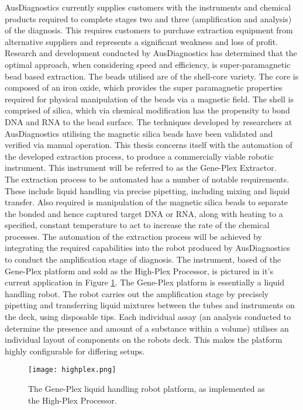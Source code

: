 AusDiagnostics currently supplies customers with the instruments and chemical products required to complete stages two and three (amplification and analysis) of the diagnosis. This requires customers to purchase extraction equipment from alternative suppliers and represents a significant weakness and loss of profit. Research and development conducted by AusDiagnostics has determined that the optimal approach, when considering speed and efficiency, is super-paramagnetic bead based extraction. The beads utilised are of the shell-core variety. The core is composed of an iron oxide, which provides the super paramagnetic properties required for physical manipulation of the beads via a magnetic field. The shell is comprised of silica, which via chemical modification has the propensity to bond DNA and RNA to the bead surface. The techniques developed by researchers at AusDiagnostics utilising the magnetic silica beads have been validated and verified via manual operation. This thesis concerns itself with the automation of the developed extraction process, to produce a commercially viable robotic instrument. This instrument will be referred to as the Gene-Plex Extractor.\\

The extraction process to be automated has a number of notable requirements. These include liquid handling via precise pipetting, including mixing and liquid transfer. Also required is manipulation of the magnetic silica beads to separate the bonded and hence captured target DNA or RNA, along with heating to a specified, constant temperature to act to increase the rate of the chemical processes. The automation of the extraction process will be achieved by integrating the required capabilities into the robot produced by AusDiagnostics to conduct the amplification stage of diagnosis. The instrument, based of the Gene-Plex platform and sold as the High-Plex Processor, is pictured in it's current application in Figure \ref{fig:highplex}. The Gene-Plex platform is essentially a liquid handling robot. The robot carries out the amplification stage by precisely pipetting and transferring liquid mixtures between the tubes and instruments on the deck, using disposable tips. Each individual assay (an analysis conducted to determine the presence and amount of a substance within a volume) utilises an individual layout of components on the robots deck. This makes the platform highly configurable for differing setups.\\

\begin{figure}
	\centering
	\texttt{[image: highplex.png]}
	\caption[High-Plex Platform.]{The Gene-Plex liquid handling robot platform, as implemented as the High-Plex Processor.}
	\label{fig:highplex}
\end{figure} 

